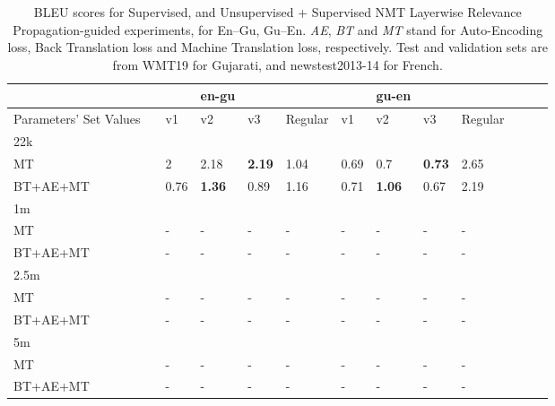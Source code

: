 
\begin{table*}[ht]
\tiny
\begin{tabular}{lB lll|l|lll|l}
\toprule
&& & \textbf{en-gu} &&&& \textbf{gu-en} && \\\hline
Parameters' Set Values &  & v1 & v2 & v3 &Regular& v1 & v2 & v3 &Regular \\\hline\hline
22k &&&&& \\\hline
MT  &&2&2.18&\textbf{2.19}&1.04&0.69&0.7 &\textbf{0.73}&2.65 \\
BT+AE+MT &&0.76&\textbf{1.36}&0.89&1.16 &0.71&\textbf{1.06}&0.67&2.19\\\hline\hline
1m  & &&&&&&&&&&&&\\\hline
MT & &-&-&-&-&-&-&-&-\\
BT+AE+MT & &-&-&-&-&-&-&-&-\\\hline\hline
2.5m  &&&&   &\\\hline
MT &  &-&-&-&-&-&-&-&-\\
BT+AE+MT &  &-&-&-&-&-&-&-&-\\\hline\hline
5m &&&&&\\\hline
MT  &&-&-&-&-&-&-&-&-\\
BT+AE+MT &&-&-&-&-&-&-&-&-
\end{tabular}
\hline
\caption{BLEU scores for Supervised, and Unsupervised + Supervised NMT Layerwise Relevance Propagation-guided experiments, for En--Gu, Gu--En. \emph{AE}, \emph{BT} and \emph{MT} stand for Auto-Encoding loss, Back Translation loss and Machine Translation loss, respectively. Test and validation sets are from WMT19 for Gujarati, and newstest2013-14 for French.}
\vspace{-2mm}
\label{table:bleu_results_lrp_gu}
\vspace{-0.5em}
\end{table*}
